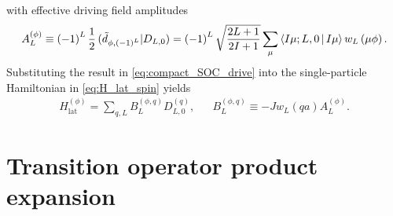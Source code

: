 \documentclass[nofootinbib,notitlepage,11pt]{revtex4-2}
\renewcommand{\t}{\text} %
\newcommand{\f}[2]{\dfrac{#1}{#2}} %
\newcommand{\p}[1]{\left(#1\right)} %
\newcommand{\bk}{\Braket} %
\newcommand{\1}{\mathds{1}}
\def\obk#1{\mathinner{({#1})}}
\begin{document}
with effective driving field amplitudes
\begin{align}
  A_L^{(\phi)}
  \equiv \p{-1}^L \f12 \obk{\tilde d_{\phi,\p{-1}^L}|D_{L,0}}
  = \p{-1}^L \sqrt{\f{2L+1}{2I+1}}
  \sum_\mu \bk{I\mu;L,0|I\mu} w_L\p{\mu\phi}.
\end{align}
Substituting the result in \eqref{eq:compact_SOC_drive} into the
single-particle Hamiltonian in \eqref{eq:H_lat_spin} yields
\begin{align}
  H_{\t{lat}}^{(\phi)} = \sum_{q,L} B_L^{(\phi,q)} D_{L,0}^{(q)},
  &&
  B_L^{(\phi,q)} \equiv -J
  w_L\p{qa} A_L^{(\phi)}.
\end{align}

\section{Transition operator product expansion}
\label{sec:trans_prod}
\end{document}
